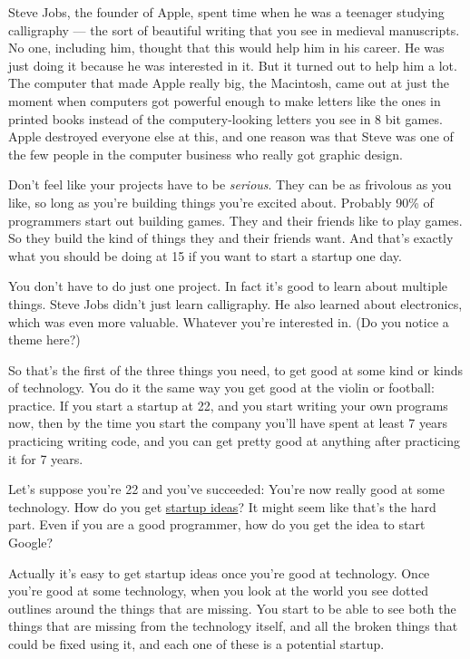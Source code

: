 \documentclass[12pt]{book}
\begin{document}
Steve Jobs, the founder of Apple, spent time when he was a teenager
studying calligraphy --- the sort of beautiful writing that you see in
medieval manuscripts. No one, including him, thought that this would
help him in his career. He was just doing it because he was interested
in it. But it turned out to help him a lot. The computer that made Apple
really big, the Macintosh, came out at just the moment when computers
got powerful enough to make letters like the ones in printed books
instead of the computery-looking letters you see in 8 bit games. Apple
destroyed everyone else at this, and one reason was that Steve was one
of the few people in the computer business who really got graphic
design.

Don't feel like your projects have to be \emph{serious}. They can be as
frivolous as you like, so long as you're building things you're excited
about. Probably 90\% of programmers start out building games. They and
their friends like to play games. So they build the kind of things they
and their friends want. And that's exactly what you should be doing at
15 if you want to start a startup one day.

You don't have to do just one project. In fact it's good to learn about
multiple things. Steve Jobs didn't just learn calligraphy. He also
learned about electronics, which was even more valuable. Whatever you're
interested in. (Do you notice a theme here?)

So that's the first of the three things you need, to get good at some
kind or kinds of technology. You do it the same way you get good at the
violin or football: practice. If you start a startup at 22, and you
start writing your own programs now, then by the time you start the
company you'll have spent at least 7 years practicing writing code, and
you can get pretty good at anything after practicing it for 7 years.

Let's suppose you're 22 and you've succeeded: You're now really good at
some technology. How do you get \href{startupideas.html}{startup ideas}?
It might seem like that's the hard part. Even if you are a good
programmer, how do you get the idea to start Google?

Actually it's easy to get startup ideas once you're good at technology.
Once you're good at some technology, when you look at the world you see
dotted outlines around the things that are missing. You start to be able
to see both the things that are missing from the technology itself, and
all the broken things that could be fixed using it, and each one of
these is a potential startup.
\end{document}
